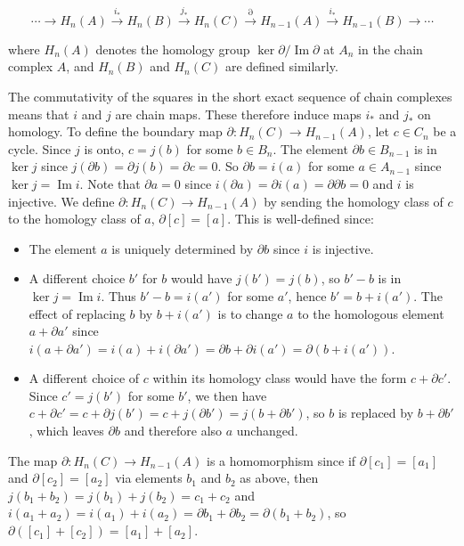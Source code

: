 \[
\cdots \to H_n(A) \xrightarrow{i_*} H_n(B) \xrightarrow{j_*} H_n(C) \xrightarrow{\partial} H_{n-1}(A) \xrightarrow{i_*} H_{n-1}(B) \to \cdots
\]

where $H_n(A)$ denotes the homology group $\ker\partial/\operatorname{Im}\partial$ at $A_n$ in the chain complex $A$, and $H_n(B)$ and $H_n(C)$ are defined similarly.

The commutativity of the squares in the short exact sequence of chain complexes means that $i$ and $j$ are chain maps. These therefore induce maps $i_*$ and $j_*$ on homology. To define the boundary map $\partial:H_n(C)\to H_{n-1}(A)$, let $c\in C_n$ be a cycle. Since $j$ is onto, $c=j(b)$ for some $b\in B_n$. The element $\partial b \in B_{n-1}$ is in $\ker j$ since $j(\partial b) = \partial j(b) = \partial c = 0$. So $\partial b = i(a)$ for some $a \in A_{n-1}$ since $\ker j = \operatorname{Im}i$. Note that $\partial a = 0$ since $i(\partial a) = \partial i(a) = \partial\partial b = 0$ and $i$ is injective. We define $\partial:H_n(C)\to H_{n-1}(A)$ by sending the homology class of $c$ to the homology class of $a$, $\partial[c] = [a]$. This is well-defined since:



\begin{itemize}
\item The element $a$ is uniquely determined by $\partial b$ since $i$ is injective.
\item A different choice $b'$ for $b$ would have $j(b') = j(b)$, so $b'-b$ is in $\ker j = \operatorname{Im}i$. Thus $b' - b = i(a')$ for some $a'$, hence $b' = b + i(a')$. The effect of replacing $b$ by $b + i(a')$ is to change $a$ to the homologous element $a + \partial a'$ since $i(a + \partial a') = i(a) + i(\partial a') = \partial b + \partial i(a') = \partial(b + i(a'))$.
\item A different choice of $c$ within its homology class would have the form $c + \partial c'$. Since $c' = j(b')$ for some $b'$, we then have $c + \partial c' = c + \partial j(b') = c + j(\partial b') = j(b + \partial b')$, so $b$ is replaced by $b + \partial b'$, which leaves $\partial b$ and therefore also $a$ unchanged.
\end{itemize}

The map $\partial:H_n(C)\to H_{n-1}(A)$ is a homomorphism since if $\partial[c_1] = [a_1]$ and $\partial[c_2] = [a_2]$ via elements $b_1$ and $b_2$ as above, then $j(b_1 + b_2) = j(b_1) + j(b_2) = c_1 + c_2$ and $i(a_1 + a_2) = i(a_1) + i(a_2) = \partial b_1 + \partial b_2 = \partial(b_1 + b_2)$, so $\partial([c_1] + [c_2]) = [a_1] + [a_2]$.

